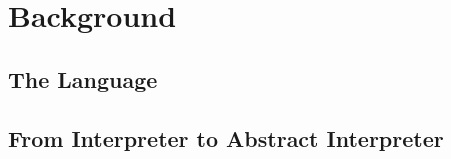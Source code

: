 \section{Background}

\subsection{The Language}

\subsection{From Interpreter to Abstract Interpreter}
